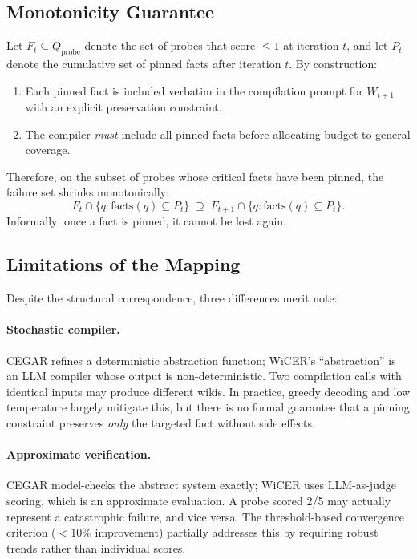 \documentclass{article}
\begin{document}
\subsection*{Monotonicity Guarantee}

Let $F_t \subseteq Q_\text{probe}$ denote the set of probes that score
$\leq 1$ at iteration $t$, and let $P_t$ denote the cumulative set of
pinned facts after iteration $t$. By construction:
\begin{enumerate}
\item Each pinned fact is included verbatim in the compilation prompt
  for $W_{t+1}$ with an explicit preservation constraint.
\item The compiler \emph{must} include all pinned facts before allocating
  budget to general coverage.
\end{enumerate}
Therefore, on the subset of probes whose critical facts have been pinned,
the failure set shrinks monotonically:
\[
  F_t \cap \{q : \text{facts}(q) \subseteq P_t\}
  \;\supseteq\;
  F_{t+1} \cap \{q : \text{facts}(q) \subseteq P_t\}.
\]
Informally: once a fact is pinned, it cannot be lost again.

\subsection*{Limitations of the Mapping}

Despite the structural correspondence, three differences merit note:

\paragraph{Stochastic compiler.}
CEGAR refines a deterministic abstraction function; WiCER's ``abstraction''
is an LLM compiler whose output is non-deterministic. Two compilation
calls with identical inputs may produce different wikis. In practice,
greedy decoding and low temperature largely mitigate this, but there is
no formal guarantee that a pinning constraint preserves \emph{only} the
targeted fact without side effects.

\paragraph{Approximate verification.}
CEGAR model-checks the abstract system exactly; WiCER uses LLM-as-judge
scoring, which is an approximate evaluation. A probe scored 2/5 may
actually represent a catastrophic failure, and vice versa. The
threshold-based convergence criterion ($< 10\%$ improvement) partially
addresses this by requiring robust trends rather than individual scores.
\end{document}
